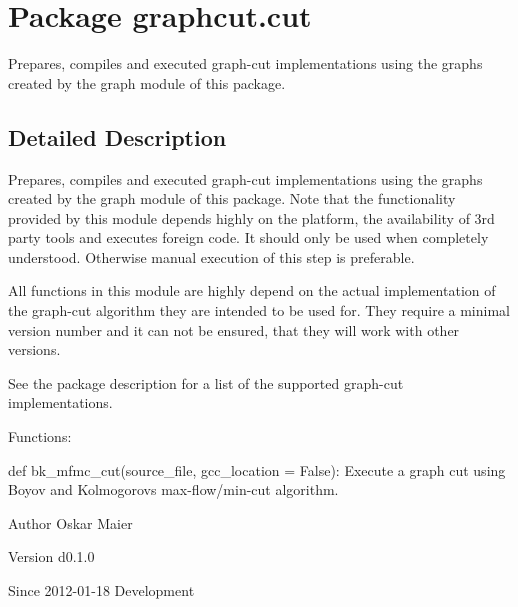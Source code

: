 \hypertarget{namespacegraphcut_1_1cut}{
\section{Package graphcut.cut}
\label{namespacegraphcut_1_1cut}
}


Prepares, compiles and executed graph-\/cut implementations using the graphs created by the graph module of this package.  




\subsection{Detailed Description}
Prepares, compiles and executed graph-\/cut implementations using the graphs created by the graph module of this package. Note that the functionality provided by this module depends highly on the platform, the availability of 3rd party tools and executes foreign code. It should only be used when completely understood. Otherwise manual execution of this step is preferable.

All functions in this module are highly depend on the actual implementation of the graph-\/cut algorithm they are intended to be used for. They require a minimal version number and it can not be ensured, that they will work with other versions.

See the package description for a list of the supported graph-\/cut implementations.

Functions:
\begin{DoxyItemize}
\item def bk\_\-mfmc\_\-cut(source\_\-file, gcc\_\-location = False): Execute a graph cut using Boyov and Kolmogorovs max-\/flow/min-\/cut algorithm.
\end{DoxyItemize}

\begin{DoxyAuthor}{Author}
Oskar Maier 
\end{DoxyAuthor}
\begin{DoxyVersion}{Version}
d0.1.0 
\end{DoxyVersion}
\begin{DoxySince}{Since}
2012-\/01-\/18  Development 
\end{DoxySince}
